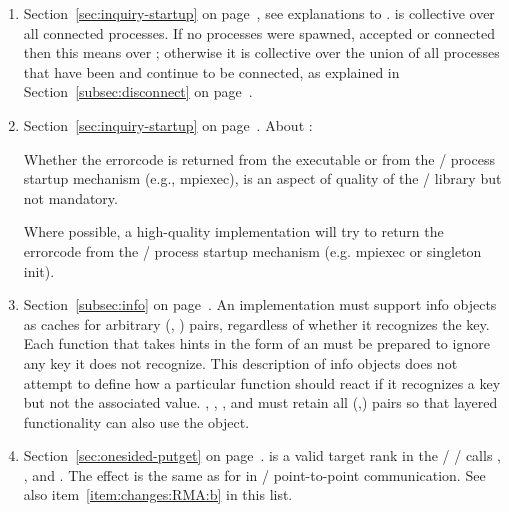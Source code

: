 \begin{enumerate}
\item
Section~\ref{sec:inquiry-startup} on page~\pageref{sec:inquiry-startup}, see explanations to .
\newline
{} is collective over all connected processes.
If no processes were spawned, accepted or connected then this means
over ; otherwise it is collective over the
union of all processes that have been and continue to be connected,
as explained in Section~\ref{subsec:disconnect} on page~\pageref{subsec:disconnect}.

\item
Section~\ref{sec:inquiry-startup} on page~\pageref{sec:inquiry-startup}.
\newline
About :
\begin{users} 
Whether the errorcode is returned from the executable or
from the \MPI/ process startup mechanism (e.g., mpiexec), is an aspect of
quality of the \MPI/ library but not mandatory.
\end{users} 
\begin{implementors} 
Where possible, a high-quality implementation will
try to return the errorcode from the \MPI/ process startup mechanism (e.g.
mpiexec or singleton init).
\end{implementors} 

\item
Section~\ref{subsec:info} on page~\pageref{subsec:info}.
\newline
An implementation must support info objects as caches for arbitrary (,
) pairs, regardless of whether it recognizes the key. Each function that
%
takes hints in the form of an  must be prepared to ignore any key it
does not recognize. This description of info objects does not attempt to
define how a particular function should react if it recognizes a key but not the
associated value. 
, ,
, and 
must retain all (,)
pairs so that layered functionality can also use the  object. 

\item\label{item:changes:RMA:a}
Section~\ref{sec:onesided-putget} on page~\pageref{sec:onesided-putget}.
\newline
{} is a valid target rank in the \MPI/ \RMA/ calls
, , and .  
The effect is the same as for  in \MPI/ point-to-point
communication.
See also item~\ref{item:changes:RMA:b} in this list. 


\end{enumerate}
